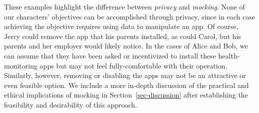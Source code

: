 These examples highlight the difference between \textit{privacy} and
\textit{mocking}. None of our characters' objectives can be accomplished
through privacy, since in each case achieving the objective requires using
data to manipulate an app. Of course, Jerry could remove the app that his
parents installed, as could Carol, but his parents and her employer would
likely notice. In the cases of Alice and Bob, we can assume that they have
been asked or incentivized to install these health-monitoring apps but may
not feel fully-comfortable with their operation. Similarly, however, removing
or disabling the apps may not be an attractive or even feasible option. We 
include a more in-depth discussion of the practical and ethical implications of 
mocking in Section~\ref{sec-discussion} after establishing the feasibility and 
desirability of this approach.
